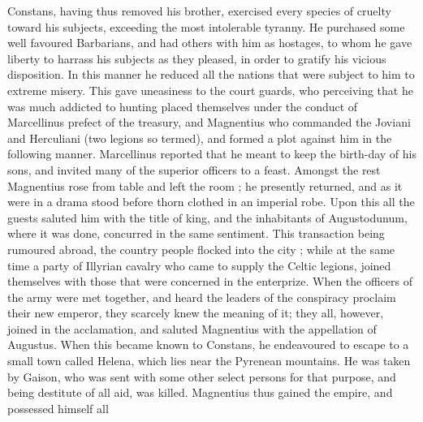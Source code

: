 Constans, having thus removed his brother, exercised every species of cruelty toward his subjects, exceeding the most intolerable tyranny. He purchased some well favoured Barbarians, and had others with him as hostages, to whom he gave liberty to harrass his subjects as they pleased, in order to gratify his vicious disposition. In this manner he reduced all the nations that were subject to him to extreme misery. This gave uneasiness to the court guards, who perceiving that he was much addicted to hunting placed themselves under the conduct of Marcellinus prefect of the treasury, and Magnentius who commanded the Joviani and Herculiani (two legions so termed), and formed a plot against him in the following manner. Marcellinus reported that he meant to keep the birth-day of his sons, and invited many of the superior officers to a feast. Amongst the rest Magnentius rose from table and left the room ; he presently returned, and as it were in a drama stood before thorn clothed in an imperial robe. Upon this all the guests saluted him with the title of king, and the inhabitants of Augustodunum, where it was done, concurred in the same sentiment. This transaction being rumoured abroad, the country people flocked into the city ; while at the same time a party of Illyrian cavalry who came to supply the Celtic legions, joined themselves with those that were concerned in the enterprize. When the officers of the army were met together, and heard the leaders of the conspiracy proclaim their new emperor, they scarcely knew the meaning of it; they all, however, joined in the acclamation, and saluted Magnentius with the appellation of Augustus. When this became known to Constans, he endeavoured
to escape to a small town called Helena, which lies near the Pyrenean mountains. He was taken by Gaison, who was sent with some other select persons for that purpose, and being destitute of all aid, was killed. Magnentius thus gained the empire, and possessed himself all

